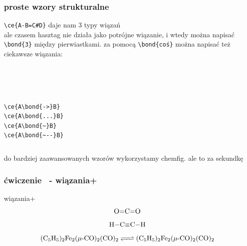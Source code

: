\documentclass{beamer}
\theoremstyle{newblock}
\begin{document}
\begin{frame}[fragile]
    \frametitle{proste wzory strukturalne}
\verb|\ce{A-B=C#D}| daje nam 3 typy wiązań  \\ \vspace{3mm}
\pause ale czasem hasztag nie działa jako potrójne wiązanie, i wtedy można napisać \verb|\bond{3}| między pierwiastkami. za pomocą \verb|\bond{coś}| można napisać też ciekawsze wiązania:\\\vspace{5mm}
\begin{columns}
     \\\vspace{1mm}
     \\\vspace{1mm}
     \\\vspace{1mm}
    \verb|\ce{A\bond{->}B}| \\\vspace{1mm}
    \verb|\ce{A\bond{...}B}| \\\vspace{1mm}
    \verb|\ce{A\bond{~}B}| \\\vspace{1mm}
    \verb|\ce{A\bond{~--}B}|
\end{columns}
\end{frame}
\begin{frame}[standout]
    do bardziej zaawansowanych wzorów wykorzystamy chemfig. ale to za sekundkę
\end{frame}

\begin{frame}[fragile=singleslide]
    \frametitle{ćwiczenie \showmycounter \ - wiązania+} 
    \begin{exampleblock}{wiązania+}
        \begin{equation}
            \ce{O=C=O}
        \end{equation}
        \begin{equation}
            \ce{H-C#C-H}
        \end{equation}
        \begin{equation}
            \ce{(C5H5)2Fe2(\mu-CO)2(CO)2 <=> (C5H5)2Fe2(\mu-CO)2(CO)2}
        \end{equation}
        
    \end{exampleblock}
\end{frame}
\end{document}
